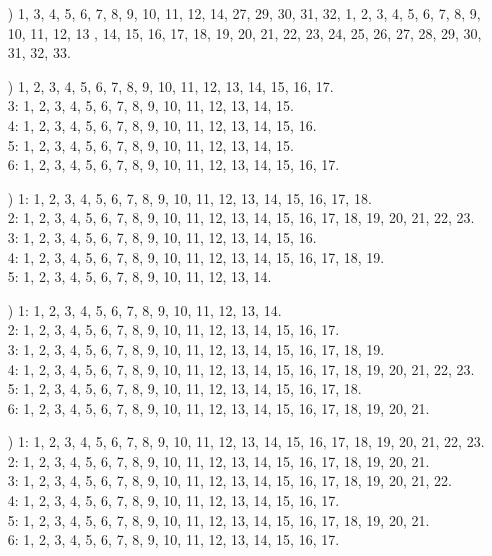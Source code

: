 \documentclass[a4paper,11pt]{article}
\numberwithin{equation}{section}
\begin{document}
\label{sec:Oznaczenia-i-konwencje}


\begin{itemize}

\item[\romannumeral1)] 1, 3, 4, 5, 6, 7, 8, 9, 10, 11, 12, 14, 27, 29,
  30, 31, 32, 1, 2, 3, 4, 5, 6, 7, 8, 9, 10, 11, 12, 13 , 14, 15, 16, 17,
  18, 19, 20, 21, 22, 23, 24, 25, 26, 27, 28, 29, 30, 31, 32, 33.

\item[\romannumeral1)] 1, 2, 3, 4, 5, 6, 7, 8, 9, 10, 11, 12, 13, 14, 15,
  16, 17. \\
  3: 1, 2, 3, 4, 5, 6, 7, 8, 9, 10, 11, 12, 13, 14, 15. \\
  4: 1, 2, 3, 4, 5, 6, 7, 8, 9, 10, 11, 12, 13, 14, 15, 16. \\
  5: 1, 2, 3, 4, 5, 6, 7, 8, 9, 10, 11, 12, 13, 14, 15. \\
  6: 1, 2, 3, 4, 5, 6, 7, 8, 9, 10, 11, 12, 13, 14, 15, 16, 17.

\item[\romannumeral2)] 1: 1, 2, 3, 4, 5, 6, 7, 8, 9, 10, 11, 12, 13, 14, 15,
  16, 17, 18. \\
  2: 1, 2, 3, 4, 5, 6, 7, 8, 9, 10, 11, 12, 13, 14, 15, 16, 17, 18, 19, 20,
  21, 22, 23. \\
  3: 1, 2, 3, 4, 5, 6, 7, 8, 9, 10, 11, 12, 13, 14, 15, 16. \\
  4: 1, 2, 3, 4, 5, 6, 7, 8, 9, 10, 11, 12, 13, 14, 15, 16, 17, 18, 19. \\
  5: 1, 2, 3, 4, 5, 6, 7, 8, 9, 10, 11, 12, 13, 14.

\item[\romannumeral3)] 1: 1, 2, 3, 4, 5, 6, 7, 8, 9, 10, 11, 12, 13, 14. \\
  2: 1, 2, 3, 4, 5, 6, 7, 8, 9, 10, 11, 12, 13, 14, 15, 16, 17. \\
  3: 1, 2, 3, 4, 5, 6, 7, 8, 9, 10, 11, 12, 13, 14, 15, 16, 17, 18, 19. \\
  4: 1, 2, 3, 4, 5, 6, 7, 8, 9, 10, 11, 12, 13, 14, 15, 16, 17, 18, 19, 20,
  21, 22, 23. \\
  5: 1, 2, 3, 4, 5, 6, 7, 8, 9, 10, 11, 12, 13, 14, 15, 16, 17, 18. \\
  6: 1, 2, 3, 4, 5, 6, 7, 8, 9, 10, 11, 12, 13, 14, 15, 16, 17, 18, 19, 20,
  21.

\item[\romannumeral4)] 1: 1, 2, 3, 4, 5, 6, 7, 8, 9, 10, 11, 12, 13, 14, 15,
  16, 17, 18, 19, 20, 21, 22, 23. \\
  2: 1, 2, 3, 4, 5, 6, 7, 8, 9, 10, 11, 12, 13, 14, 15, 16, 17, 18, 19, 20,
  21. \\
  3: 1, 2, 3, 4, 5, 6, 7, 8, 9, 10, 11, 12, 13, 14, 15, 16, 17, 18, 19, 20,
  21, 22. \\
  4: 1, 2, 3, 4, 5, 6, 7, 8, 9, 10, 11, 12, 13, 14, 15, 16, 17. \\
  5: 1, 2, 3, 4, 5, 6, 7, 8, 9, 10, 11, 12, 13, 14, 15, 16, 17, 18, 19, 20,
  21. \\
  6: 1, 2, 3, 4, 5, 6, 7, 8, 9, 10, 11, 12, 13, 14, 15, 16, 17.


\end{itemize}
\end{document}
